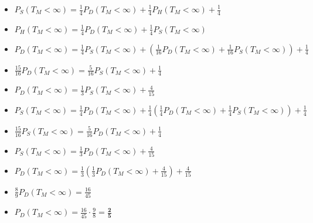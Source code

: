 \documentclass[12pt]{article}
\begin{document}
\begin{enumerate}[label=(\alph*)]
\begin{itemize}
        \item $P_S(T_M<\infty) = \frac{1}{4}P_D(T_M<\infty) + \frac{1}{4}P_H(T_M<\infty) + \frac{1}{4}$
        
        \item $P_H(T_M<\infty) = \frac{1}{4}P_D(T_M<\infty) + \frac{1}{4}P_S(T_M<\infty)$\\

        \item $P_D(T_M<\infty) = \frac{1}{4}P_S(T_M<\infty) + \left(\frac{1}{16}P_D(T_M<\infty) + \frac{1}{16}P_S(T_M<\infty)\right) + \frac{1}{4}$
        
        \item $\frac{15}{16} P_D(T_M<\infty) = \frac{5}{16}P_S(T_M<\infty) + \frac{1}{4}$
        
        \item $P_D(T_M<\infty) = \frac{1}{3}P_S(T_M<\infty) + \frac{4}{15}$\\
        
        \item $P_S(T_M<\infty) = \frac{1}{4}P_D(T_M<\infty) + \frac{1}{4}\left(\frac{1}{4}P_D(T_M<\infty) + \frac{1}{4}P_S(T_M<\infty)\right) + \frac{1}{4}$
        
        \item $\frac{15}{16}P_S(T_M<\infty) = \frac{5}{16}P_D(T_M<\infty) +  \frac{1}{4} $
        
        \item $P_S(T_M<\infty) = \frac{1}{3}P_D(T_M<\infty) +  \frac{4}{15}$\\
        
        \item $P_D(T_M<\infty) = \frac{1}{3}\left(\frac{1}{3}P_D(T_M<\infty) +                                            \frac{4}{15}\right) + \frac{4}{15}$
        \item $\frac{8}{9} P_D(T_M<\infty) = \frac{16}{45}$
        \item $P_D(T_M<\infty) = \frac{16}{45}\cdot \frac{9}{8} = \mathbf{\frac{2}{5}}$
\end{itemize}
    
\end{enumerate}
\end{document}
